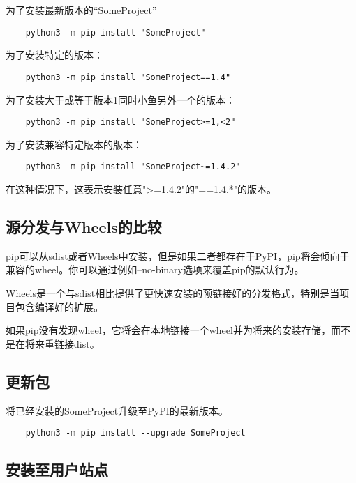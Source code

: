 \documentclass[../package_tutorial.tex]{subfiles}
\begin{document}
为了安装最新版本的“SomeProject”

\begin{lstlisting}
    python3 -m pip install "SomeProject"
\end{lstlisting}

为了安装特定的版本：

\begin{lstlisting}
    python3 -m pip install "SomeProject==1.4"
\end{lstlisting}

为了安装大于或等于版本1同时小鱼另外一个的版本：

\begin{lstlisting}
    python3 -m pip install "SomeProject>=1,<2"
\end{lstlisting}

为了安装兼容特定版本的版本：

\begin{lstlisting}
    python3 -m pip install "SomeProject~=1.4.2"
\end{lstlisting}

在这种情况下，这表示安装任意">=1.4.2"的"==1.4.*"的版本。

\subsection{源分发与Wheels的比较}

pip可以从sdist或者Wheels中安装，但是如果二者都存在于PyPI，pip将会倾向于兼容的wheel。你可以通过例如--no-binary选项来覆盖pip的默认行为。

Wheels是一个与sdist相比提供了更快速安装的预链接好的分发格式，特别是当项目包含编译好的扩展。

如果pip没有发现wheel，它将会在本地链接一个wheel并为将来的安装存储，而不是在将来重链接dist。

\subsection{更新包}

将已经安装的SomeProject升级至PyPI的最新版本。

\begin{lstlisting}
    python3 -m pip install --upgrade SomeProject
\end{lstlisting}

\subsection{安装至用户站点}
\end{document}
